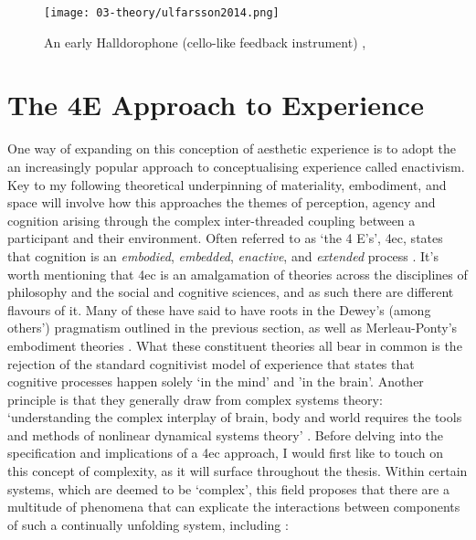 \begin{figure}[h]
    \centering
    \texttt{[image: 03-theory/ulfarsson2014.png]}
    \captionsetup{justification=centering,margin=1.5cm}
    \caption{An early Halldorophone (cello-like feedback instrument) \citep[image from][]{ulfarsson2014}, \citep[information from][]{ulfarsson2018}}\label{fig: ulfarsson2014}
\end{figure}

\section{The 4E Approach to Experience}\label{sec: theory-4e}
One way of expanding on this conception of aesthetic experience is to adopt the an increasingly popular approach to conceptualising experience called enactivism. Key to my following theoretical underpinning of materiality, embodiment, and space will involve how this approaches the themes of perception, agency and cognition arising through the complex inter-threaded coupling between a participant and their environment. Often referred to as `the 4 E's', \gls{4ec}, states that cognition is an \textit{embodied}, \textit{embedded}, \textit{enactive}, and \textit{extended} process \citep{gallagher2017}. It's worth mentioning that \gls{4ec} is an amalgamation of theories across the disciplines of philosophy and the social and cognitive sciences, and as such there are different flavours of it. Many of these have said to have roots in the Dewey's (among others') pragmatism outlined in the previous section, as well as Merleau-Ponty's embodiment theories \citep{zavota2016}. What these constituent theories all bear in common is the rejection of the standard cognitivist model of experience that states that cognitive processes happen solely `in the mind' and 'in the brain'. Another principle is that they generally draw from complex systems theory: `understanding the complex interplay of brain, body and world requires the tools and methods of nonlinear dynamical systems theory' \citep{clark1999}. Before delving into the specification and implications of a \gls{4ec} approach, I would first like to touch on this concept of complexity, as it will surface throughout the thesis. Within certain systems, which are deemed to be `complex', this field proposes that there are a multitude of phenomena that can explicate the interactions between components of such a continually unfolding system, including \citep{dedomenico2019}:
